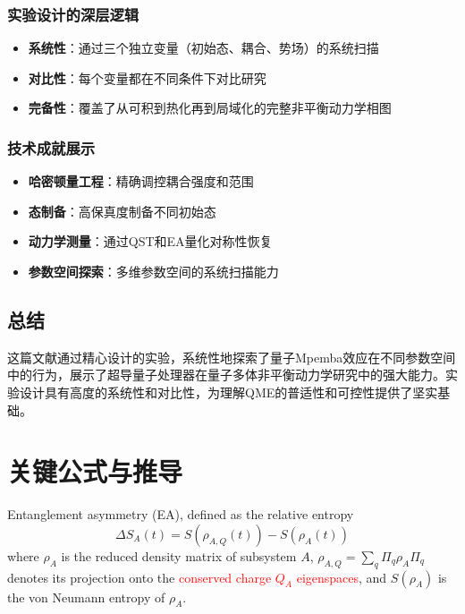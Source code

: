 \documentclass[11pt,a4paper]{article}
\begin{document}
\subsubsection{实验设计的深层逻辑}
\begin{itemize}
    \item \textbf{系统性}：通过三个独立变量（初始态、耦合、势场）的系统扫描
    \item \textbf{对比性}：每个变量都在不同条件下对比研究
    \item \textbf{完备性}：覆盖了从可积到热化再到局域化的完整非平衡动力学相图
\end{itemize}

\subsubsection{技术成就展示}
\begin{itemize}
    \item \textbf{哈密顿量工程}：精确调控耦合强度和范围
    \item \textbf{态制备}：高保真度制备不同初始态
    \item \textbf{动力学测量}：通过QST和EA量化对称性恢复
    \item \textbf{参数空间探索}：多维参数空间的系统扫描能力
\end{itemize}

\subsection{总结}

这篇文献通过精心设计的实验，系统性地探索了量子Mpemba效应在不同参数空间中的行为，展示了超导量子处理器在量子多体非平衡动力学研究中的强大能力。实验设计具有高度的系统性和对比性，为理解QME的普适性和可控性提供了坚实基础。


\section{关键公式与推导}
Entanglement asymmetry (EA), defined as the relative entropy
\begin{equation}
\Delta S_A(t)=S\left(\rho_{A, Q}(t)\right)-S\left(\rho_A(t)\right)
\end{equation}
where $\rho_A$ is the reduced density matrix of subsystem $A$, $\rho_{A, Q}=\sum_q \Pi_q \rho_A \Pi_q$ denotes its projection onto the \textcolor{red}{conserved charge $Q_A$ eigenspaces}, and $S\left(\rho_A\right)$ is the von Neumann entropy of $\rho_A$. 
\end{document}
